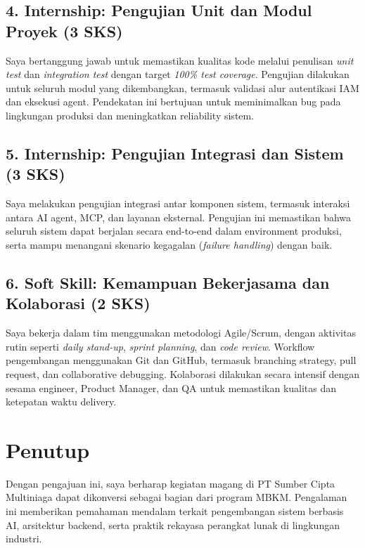 \documentclass[a4paper,12pt]{article}
\begin{document}
\subsection*{4. Internship: Pengujian Unit dan Modul Proyek (3 SKS)}
Saya bertanggung jawab untuk memastikan kualitas kode melalui penulisan \textit{unit test} dan \textit{integration test} dengan target \textit{100\% test coverage}. Pengujian dilakukan untuk seluruh modul yang dikembangkan, termasuk validasi alur autentikasi IAM dan eksekusi agent. Pendekatan ini bertujuan untuk meminimalkan bug pada lingkungan produksi dan meningkatkan reliability sistem.

\subsection*{5. Internship: Pengujian Integrasi dan Sistem (3 SKS)}
Saya melakukan pengujian integrasi antar komponen sistem, termasuk interaksi antara AI agent, MCP, dan layanan eksternal. Pengujian ini memastikan bahwa seluruh sistem dapat berjalan secara end-to-end dalam environment produksi, serta mampu menangani skenario kegagalan (\textit{failure handling}) dengan baik.

\subsection*{6. Soft Skill: Kemampuan Bekerjasama dan Kolaborasi (2 SKS)}
Saya bekerja dalam tim menggunakan metodologi Agile/Scrum, dengan aktivitas rutin seperti \textit{daily stand-up}, \textit{sprint planning}, dan \textit{code review}. Workflow pengembangan menggunakan Git dan GitHub, termasuk branching strategy, pull request, dan collaborative debugging. Kolaborasi dilakukan secara intensif dengan sesama engineer, Product Manager, dan QA untuk memastikan kualitas dan ketepatan waktu delivery.

\section{Penutup}
Dengan pengajuan ini, saya berharap kegiatan magang di PT Sumber Cipta Multiniaga dapat dikonversi sebagai bagian dari program MBKM. Pengalaman ini memberikan pemahaman mendalam terkait pengembangan sistem berbasis AI, arsitektur backend, serta praktik rekayasa perangkat lunak di lingkungan industri.

\newpage
\end{document}
